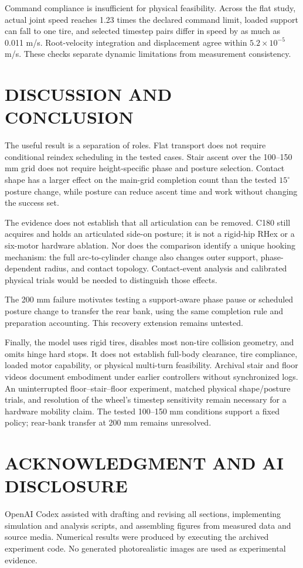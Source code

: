 \documentclass[letterpaper,10pt,conference]{ieeeconf}
\begin{document}
Command compliance is insufficient for physical feasibility. Across the flat study, actual joint speed reaches 1.23 times the declared command limit, loaded support can fall to one tire, and selected timestep pairs differ in speed by as much as 0.011 m/s. Root-velocity integration and displacement agree within $5.2\times10^{-5}$ m/s. These checks separate dynamic limitations from measurement consistency.

\section{DISCUSSION AND CONCLUSION}
The useful result is a separation of roles. Flat transport does not require conditional reindex scheduling in the tested cases. Stair ascent over the 100--150 mm grid does not require height-specific phase and posture selection. Contact shape has a larger effect on the main-grid completion count than the tested $15^\circ$ posture change, while posture can reduce ascent time and work without changing the success set. 

The evidence does not establish that all articulation can be removed. C180 still acquires and holds an articulated side-on posture; it is not a rigid-hip RHex or a six-motor hardware ablation. Nor does the comparison identify a unique hooking mechanism: the full arc-to-cylinder change also changes outer support, phase-dependent radius, and contact topology. Contact-event analysis and calibrated physical trials would be needed to distinguish those effects.

The 200 mm failure motivates testing a support-aware phase pause or scheduled posture change to transfer the rear bank, using the same completion rule and preparation accounting. This recovery extension remains untested.

Finally, the model uses rigid tires, disables most non-tire collision geometry, and omits hinge hard stops. It does not establish full-body clearance, tire compliance, loaded motor capability, or physical multi-turn feasibility. Archival stair and floor videos document embodiment under earlier controllers without synchronized logs. An uninterrupted floor--stair--floor experiment, matched physical shape/posture trials, and resolution of the wheel's timestep sensitivity remain necessary for a hardware mobility claim. The tested 100--150 mm conditions support a fixed policy; rear-bank transfer at 200 mm remains unresolved.

\section*{ACKNOWLEDGMENT AND AI DISCLOSURE}
OpenAI Codex assisted with drafting and revising all sections, implementing simulation and analysis scripts, and assembling figures from measured data and source media. Numerical results were produced by executing the archived experiment code. No generated photorealistic images are used as experimental evidence.

\end{document}
